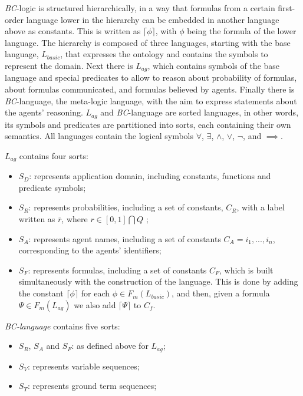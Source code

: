 \textit{BC}-logic is structured hierarchically, in a way that formulas from a certain first-order language lower in the hierarchy can be embedded in another language above as constants. This is written as $\lceil\phi\rceil$, with $\phi$ being the formula of the lower language.
The hierarchy is composed of three languages, starting with the base language, \textit{$L_{basic}$}, that expresses the ontology and contains the symbols to represent the domain. Next there is \textit{$L_{ag}$}, which contains symbols of the base language and special predicates to allow to reason about probability of formulas, about formulas communicated, and formulas believed by agents. Finally there is \textit{BC}-language, the meta-logic language, with the aim to express statements about the agents' reasoning. \textit{$L_{ag}$} and \textit{BC}-language are sorted languages, in other words, its symbols and predicates are partitioned into sorts, each containing their own semantics. All languages contain the logical symbols $\forall$, $\exists$, $\wedge$, $\vee$, $\neg$, and $\implies$.

\textit{$L_{ag}$} contains four sorts:
\begin{itemize}
	\item $S_D$: represents application domain, including constants, functions and predicate symbols;
	\item $S_R$: represents probabilities, including a set of constants, $C_R$, with a label written as $\overline{r}$, where $r \in [0,1]\bigcap Q$ ;
	\item $S_A$: represents agent names, including a set of constants $C_A = {i_1, ..., i_n}$, corresponding to the agents' identifiers;
	\item $S_F$: represents formulas, including a set of constants $C_F$, which is built simultaneously with the construction of the language. This is done by adding the constant $\lceil\phi\rceil$ for each $\phi \in F_m(L_{basic})$, and then, given a formula $\Psi \in F_m(L_{ag})$ we also add $\lceil\Psi\rceil$ to $C_f$.
\end{itemize}


\textit{\textit{BC}-language} contains five sorts:
\begin{itemize}
	\item $S_R$, $S_A$ and $S_F$: as defined above for $L_{ag}$;
	\item $S_V$: represents variable sequences;
	\item $S_T$: represents ground term sequences;
\end{itemize}

